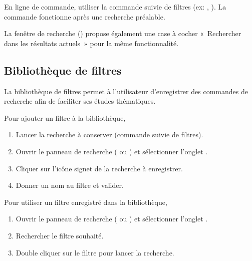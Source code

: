 \documentclass[letterpaper,10pt,french]{sphinxmanual}
\begin{document}
\sphinxAtStartPar
En ligne de commande, utiliser la commande  suivie de filtres (ex: ,
). La commande  fonctionne après une recherche préalable.

\sphinxAtStartPar
La fenêtre de recherche () propose également une case à cocher
« Rechercher dans les résultats actuels » pour la même fonctionnalité.


\subsection{Bibliothèque de filtres}
\label{\detokenize{annexe_filtres:bibliotheque-de-filtres}}
\sphinxAtStartPar
La bibliothèque de filtres permet à l’utilisateur d’enregistrer des commandes de recherche
afin de faciliter ses études thématiques.

\sphinxAtStartPar
Pour ajouter un filtre à la bibliothèque,
\begin{enumerate}
%
\item {} 
\sphinxAtStartPar
Lancer la recherche à conserver (commande  suivie de filtres).

\item {} 
\sphinxAtStartPar
Ouvrir le panneau de recherche ( ou ) et sélectionner
l’onglet .

\item {} 
\sphinxAtStartPar
Cliquer sur l’icône signet de la recherche à enregistrer.

\item {} 
\sphinxAtStartPar
Donner un nom au filtre et valider.

\end{enumerate}

\sphinxAtStartPar
Pour utiliser un filtre enregistré dans la bibliothèque,
\begin{enumerate}
%
\item {} 
\sphinxAtStartPar
Ouvrir le panneau de recherche ( ou ) et sélectionner
l’onglet .

\item {} 
\sphinxAtStartPar
Rechercher le filtre souhaité.

\item {} 
\sphinxAtStartPar
Double cliquer sur le filtre pour lancer la recherche.

\end{enumerate}
\end{document}
